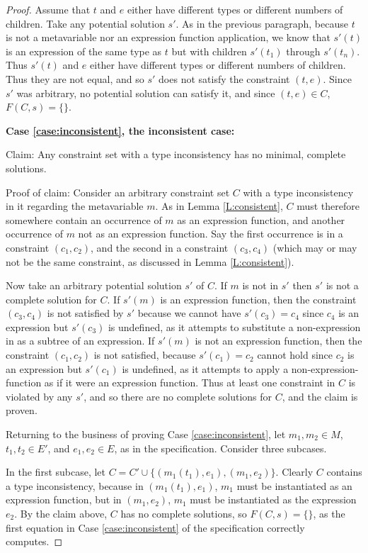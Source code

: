 \documentclass{article}
\begin{document}
\begin{proof}
Assume that $t$ and $e$ either have different types or different numbers of children.  Take any potential solution $s'$.  As in the previous paragraph, because $t$ is not a metavariable nor an expression function application, we know that $s'(t)$ is an expression of the same type as $t$ but with children $s'(t_1)$ through $s'(t_n)$.  Thus $s'(t)$ and $e$ either have different types or different numbers of children.  Thus they are not equal, and so $s'$ does not satisfy the constraint $(t,e)$.  Since $s'$ was arbitrary, no potential solution can satisfy it, and since $(t,e)\in C$, $F(C,s)=\{\}$.

{\bf Case \ref{case:inconsistent}, the inconsistent case:}

Claim:  Any constraint set with a type inconsistency has no minimal, complete solutions.

Proof of claim:  Consider an arbitrary constraint set $C$ with a type inconsistency in it regarding the metavariable $m$.  As in Lemma \ref{L:consistent}, $C$ must therefore somewhere contain an occurrence of $m$ as an expression function, and another occurrence of $m$ not as an expression function.  Say the first occurrence is in a constraint $(c_1,c_2)$, and the second in a constraint $(c_3,c_4)$ (which may or may not be the same constraint, as discussed in Lemma \ref{L:consistent}).

Now take an arbitrary potential solution $s'$ of $C$.  If $m$ is not in $s'$ then $s'$ is not a complete solution for $C$.  If $s'(m)$ is an expression function, then the constraint $(c_3,c_4)$ is not satisfied by $s'$ because we cannot have $s'(c_3)=c_4$ since $c_4$ is an expression but $s'(c_3)$ is undefined, as it attempts to substitute a non-expression in as a subtree of an expression.  If $s'(m)$ is not an expression function, then the constraint $(c_1,c_2)$ is not satisfied, because $s'(c_1)=c_2$ cannot hold since $c_2$ is an expression but $s'(c_1)$ is undefined, as it attempts to apply a non-expression-function as if it were an expression function.  Thus at least one constraint in $C$ is violated by any $s'$, and so there are no complete solutions for $C$, and the claim is proven.

Returning to the business of proving Case \ref{case:inconsistent}, let $m_1,m_2\in M$, $t_1,t_2\in E'$, and $e_1,e_2\in E$, as in the specification.  Consider three subcases.

In the first subcase, let $C=C'\cup\{(m_1(t_1),e_1),(m_1,e_2)\}$.  Clearly $C$ contains a type inconsistency, because in $(m_1(t_1),e_1)$, $m_1$ must be instantiated as an expression function, but in $(m_1,e_2)$, $m_1$ must be instantiated as the expression $e_2$.  By the claim above, $C$ has no complete solutions, so $F(C,s)=\{\}$, as the first equation in Case \ref{case:inconsistent} of the specification correctly computes.


\end{proof}
\end{document}
